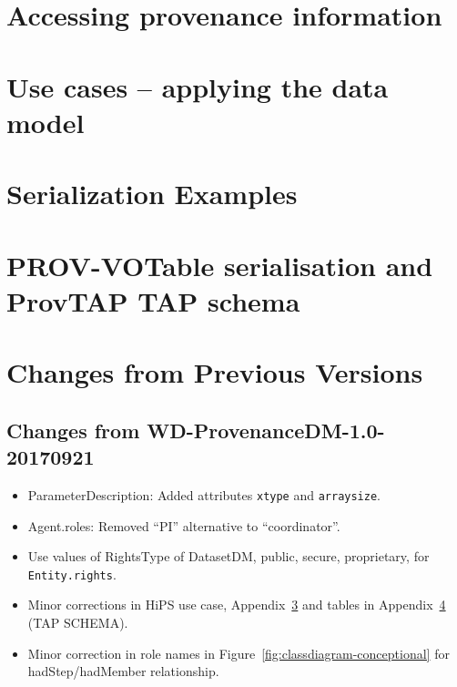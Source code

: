 \documentclass[11pt,a4paper]{ivoa}
\newcommand{\attribute}[1]{\texttt{#1}}
\begin{document}
\section{Accessing provenance information}
\label{sec:provaccess}



\section{Use cases -- applying the data model}
\label{sec:usecases-implementations}


\begin{appendices}

\section{Serialization Examples}
\label{sec:appendix-serialization-examples}



\section{PROV-VOTable serialisation and ProvTAP TAP schema}
\label{sec:appendix-prov-votable}


\section{Changes from Previous Versions}
\subsection{Changes from WD-ProvenanceDM-1.0-20170921}
\begin{itemize}
\item ParameterDescription: Added attributes \attribute{xtype} and \attribute{arraysize}.
\item Agent.roles: Removed ``PI'' alternative to ``coordinator''.
\item Use values of RightsType of DatasetDM, public, secure, proprietary, for \attribute{Entity.rights}.
\item Minor corrections in HiPS use case, Appendix~\ref{sec:appendix-serialization-examples} and tables in Appendix~\ref{sec:appendix-prov-votable} (TAP SCHEMA).
\item Minor correction in role names in Figure~\ref{fig:classdiagram-conceptional} for hadStep/hadMember relationship.
\end{itemize}


\end{appendices}
\end{document}
